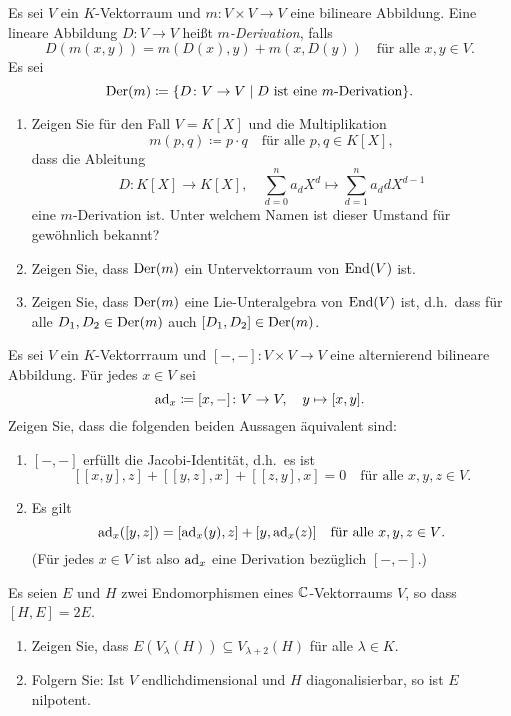 \documentclass[a4paper,10pt]{scrartcl}
\begin{document}
\begin{question}
  Es sei $V$ ein $K$-Vektorraum und $m \colon V \times V \to V$ eine bilineare Abbildung.
  Eine lineare Abbildung $D \colon V \to V$ heißt \emph{$m$-Derivation}, falls
  \[
    D(m(x,y))
    = m(D(x), y) + m(x, D(y))
    \quad
    \text{für alle $x, y \in V$}.
  \]
  Es sei
  \[
              \operatorname{Der}(m)
    \coloneqq \{ D \colon V \to V \mid \text{$D$ ist eine $m$-Derivation} \}.
  \]
  \begin{enumerate}[leftmargin=*]
    \item
      Zeigen Sie für den Fall $V = K[X]$ und die Multiplikation
      \[
        m(p,q) \coloneqq p \cdot q
        \quad
        \text{für alle $p, q \in K[X]$},
      \]
      dass die Ableitung
      \[
        D \colon K[X] \to K[X],
        \quad
        \sum_{d=0}^n a_d X^d  \mapsto \sum_{d=1}^n a_d d X^{d-1} 
      \]
      eine $m$-Derivation ist.
      Unter welchem Namen ist dieser Umstand für gewöhnlich bekannt?
    \item
      Zeigen Sie, dass $\operatorname{Der}(m)$ ein Untervektorraum von $\operatorname{End}(V)$ ist.
    \item
      Zeigen Sie, dass $\operatorname{Der}(m)$ eine Lie-Unteralgebra von $\operatorname{End}(V)$ ist, d.h.\ dass für alle $D_1, D_2 \in \operatorname{Der}(m)$ auch $[D_1, D_2] \in \operatorname{Der}(m)$.
  \end{enumerate}
\end{question}


\begin{question}
  Es sei $V$ ein $K$-Vektorrraum und $[-,-] \colon V \times V \to V$ eine alternierend bilineare Abbildung.
  Für jedes $x \in V$ sei
  \[
    \operatorname{ad}_x \coloneqq [x,-] \colon V \to V, \quad y \mapsto [x,y].
  \]
  Zeigen Sie, dass die folgenden beiden Aussagen äquivalent sind:
  \begin{enumerate}
    \item
      $[-,-]$ erfüllt die Jacobi-Identität, d.h.\ es ist
      \[
        [[x,y],z] + [[y,z],x] + [[z,y],x] = 0
        \quad
        \text{für alle $x, y, z \in V$}.
      \]
    \item
      Es gilt
      \[
          \operatorname{ad}_x([y,z])
        = [\operatorname{ad}_x(y), z] + [y, \operatorname{ad}_x(z)]
        \quad
        \text{für alle $x, y, z \in V$}.
      \]
      (Für jedes $x \in V$ ist also $\operatorname{ad}_x$ eine Derivation bezüglich $[-,-]$.)
  \end{enumerate}
\end{question}



\begin{question}
  Es seien $E$ und $H$ zwei Endomorphismen eines $\mathbb{C}$-Vektorraums $V$, so dass $[H,E] = 2E$.
  \begin{enumerate}[leftmargin=*]
    \item
      Zeigen Sie, dass $E(V_\lambda(H)) \subseteq V_{\lambda + 2}(H)$ für alle $\lambda \in K$.
    \item
      Folgern Sie: Ist $V$ endlichdimensional und $H$ diagonalisierbar, so ist $E$ nilpotent.
  \end{enumerate}
\end{question}
\end{document}
